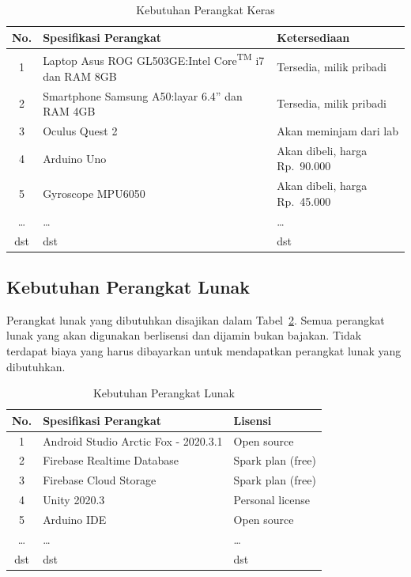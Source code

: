 \documentclass[a4paper,11pt,oneside]{report}
\begin{document}
\begin{table}[H]
    \caption{Kebutuhan Perangkat Keras}
    \label{tab:kebutuhan-hw}
    \centering
    \footnotesize
    \begin{tabular}{|c|p{6.5cm}|p{4cm}|}
        \hline
        \textbf{No.} & \textbf{Spesifikasi Perangkat} & \textbf{Ketersediaan} \\ \hline
        1 & Laptop Asus ROG GL503GE:\newline Intel Core\textsuperscript{TM} i7 dan RAM 8GB & Tersedia, milik pribadi \\ \hline
        2 & Smartphone Samsung A50:\newline layar 6.4'' dan RAM 4GB & Tersedia, milik pribadi \\ \hline
        3 & Oculus Quest 2 & Akan meminjam dari lab \\ \hline
        4 & Arduino Uno & Akan dibeli, harga Rp.\ 90.000 \\ \hline
        5 & Gyroscope MPU6050 & Akan dibeli, harga Rp.\ 45.000 \\ \hline
        \ldots & \ldots & \ldots \\ \hline
        dst & dst & dst \\ \hline
    \end{tabular}
\end{table}

\subsection{Kebutuhan Perangkat Lunak}
Perangkat lunak yang dibutuhkan disajikan dalam Tabel~\ref{tab:kebutuhan-sw}.
Semua perangkat lunak yang akan digunakan berlisensi dan dijamin bukan bajakan.
Tidak terdapat biaya yang harus dibayarkan untuk mendapatkan perangkat lunak
yang dibutuhkan.

\begin{table}[H]
    \caption{Kebutuhan Perangkat Lunak}
    \label{tab:kebutuhan-sw}
    \centering
    \begin{tabular}{|c|p{6.5cm}|p{4cm}|}
        \hline
        \textbf{No.} & \textbf{Spesifikasi Perangkat} & \textbf{Lisensi} \\ \hline
        1 & Android Studio Arctic Fox - 2020.3.1 & Open source \\ \hline
        2 & Firebase Realtime Database & Spark plan (free) \\ \hline
        3 & Firebase Cloud Storage & Spark plan (free) \\ \hline
        4 & Unity 2020.3 & Personal license \\ \hline
        5 & Arduino IDE & Open source \\ \hline
        \ldots & \ldots & \ldots \\ \hline
        dst & dst & dst \\ \hline
    \end{tabular}
\end{table}
\end{document}
